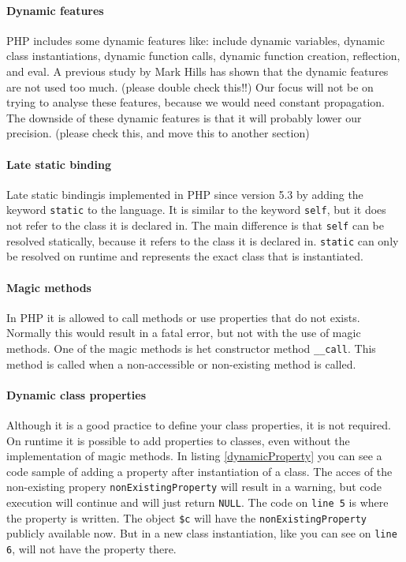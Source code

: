 \documentclass[../main.tex]{subfiles}
\begin{document}
    
    \paragraph{Dynamic features}
    PHP includes some dynamic features like: include dynamic variables, dynamic class instantiations, dynamic function calls, dynamic function creation, reflection, and eval.
    A previous study by Mark Hills\cite{Hil:13} has shown that the dynamic features are not used too much. (please double check this!!) %
    Our focus will not be on trying to analyse these features, because we would need constant propagation.
    The downside of these dynamic features is that it will probably lower our precision. (please check this, and move this to another section) %
    

    \paragraph{Late static binding}
    Late static binding\footnotemark is implemented in PHP since version 5.3 by adding the keyword \texttt{static} to the language.
    It is similar to the keyword \texttt{self}, but it does not refer to the class it is declared in. 
    The main difference is that \texttt{self} can be resolved statically, because it refers to the class it is declared in.
    \texttt{static} can only be resolved on runtime and represents the exact class that is instantiated.
    
    \paragraph{Magic methods}
    In PHP it is allowed to call methods or use properties that do not exists.
    Normally this would result in a fatal error, but not with the use of magic methods.
    One of the magic methods is het constructor method \texttt{\_\_{}call}.
    This method is called when a non-accessible or non-existing method is called.

    \paragraph{Dynamic class properties}
    Although it is a good practice to define your class properties, it is not required.
    On runtime it is possible to add properties to classes, even without the implementation of magic methods.
    In listing \ref{dynamicProperty} you can see a code sample of adding a property after instantiation of a class.
    The acces of the non-existing propery \texttt{nonExistingProperty} will result in a warning, but code execution will continue and will just return \texttt{NULL}.
    The code on \texttt{line 5} is where the property is written.
    The object \texttt{\$c} will have the \texttt{nonExistingProperty} publicly available now.
    But in a new class instantiation, like you can see on \texttt{line 6}, will not have the property there.
    
\end{document}
